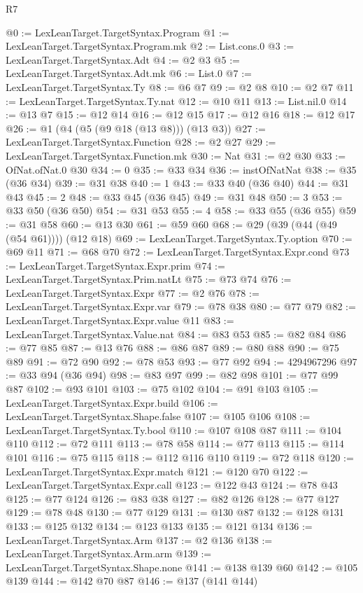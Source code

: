 \begin{lexlean}{R7}
\begin{coremodule}
@0 := LexLeanTarget.TargetSyntax.Program
@1 := LexLeanTarget.TargetSyntax.Program.mk
@2 := List.cons.{0}
@3 := LexLeanTarget.TargetSyntax.Adt
@4 := @2 @3
@5 := LexLeanTarget.TargetSyntax.Adt.mk
@6 := List.{0}
@7 := LexLeanTarget.TargetSyntax.Ty
@8 := @6 @7
@9 := @2 @8
@10 := @2 @7
@11 := LexLeanTarget.TargetSyntax.Ty.nat
@12 := @10 @11
@13 := List.nil.{0}
@14 := @13 @7
@15 := @12 @14
@16 := @12 @15
@17 := @12 @16
@18 := @12 @17
@26 := @1 (@4 (@5 (@9 @18 (@13 @8))) (@13 @3))
@27 := LexLeanTarget.TargetSyntax.Function
@28 := @2 @27
@29 := LexLeanTarget.TargetSyntax.Function.mk
@30 := Nat
@31 := @2 @30
@33 := OfNat.ofNat.{0} @30
@34 := 0
@35 := @33 @34
@36 := instOfNatNat
@38 := @35 (@36 @34)
@39 := @31 @38
@40 := 1
@43 := @33 @40 (@36 @40)
@44 := @31 @43
@45 := 2
@48 := @33 @45 (@36 @45)
@49 := @31 @48
@50 := 3
@53 := @33 @50 (@36 @50)
@54 := @31 @53
@55 := 4
@58 := @33 @55 (@36 @55)
@59 := @31 @58
@60 := @13 @30
@61 := @59 @60
@68 := @29 (@39 (@44 (@49 (@54 @61)))) (@12 @18)
@69 := LexLeanTarget.TargetSyntax.Ty.option
@70 := @69 @11
@71 := @68 @70
@72 := LexLeanTarget.TargetSyntax.Expr.cond
@73 := LexLeanTarget.TargetSyntax.Expr.prim
@74 := LexLeanTarget.TargetSyntax.Prim.natLt
@75 := @73 @74
@76 := LexLeanTarget.TargetSyntax.Expr
@77 := @2 @76
@78 := LexLeanTarget.TargetSyntax.Expr.var
@79 := @78 @38
@80 := @77 @79
@82 := LexLeanTarget.TargetSyntax.Expr.value @11
@83 := LexLeanTarget.TargetSyntax.Value.nat
@84 := @83 @53
@85 := @82 @84
@86 := @77 @85
@87 := @13 @76
@88 := @86 @87
@89 := @80 @88
@90 := @75 @89
@91 := @72 @90
@92 := @78 @53
@93 := @77 @92
@94 := 4294967296
@97 := @33 @94 (@36 @94)
@98 := @83 @97
@99 := @82 @98
@101 := @77 @99 @87
@102 := @93 @101
@103 := @75 @102
@104 := @91 @103
@105 := LexLeanTarget.TargetSyntax.Expr.build
@106 := LexLeanTarget.TargetSyntax.Shape.false
@107 := @105 @106
@108 := LexLeanTarget.TargetSyntax.Ty.bool
@110 := @107 @108 @87
@111 := @104 @110
@112 := @72 @111
@113 := @78 @58
@114 := @77 @113
@115 := @114 @101
@116 := @75 @115
@118 := @112 @116 @110
@119 := @72 @118
@120 := LexLeanTarget.TargetSyntax.Expr.match
@121 := @120 @70
@122 := LexLeanTarget.TargetSyntax.Expr.call
@123 := @122 @43
@124 := @78 @43
@125 := @77 @124
@126 := @83 @38
@127 := @82 @126
@128 := @77 @127
@129 := @78 @48
@130 := @77 @129
@131 := @130 @87
@132 := @128 @131
@133 := @125 @132
@134 := @123 @133
@135 := @121 @134
@136 := LexLeanTarget.TargetSyntax.Arm
@137 := @2 @136
@138 := LexLeanTarget.TargetSyntax.Arm.arm
@139 := LexLeanTarget.TargetSyntax.Shape.none
@141 := @138 @139 @60
@142 := @105 @139
@144 := @142 @70 @87
@146 := @137 (@141 @144)

\end{coremodule}
\end{lexlean}
